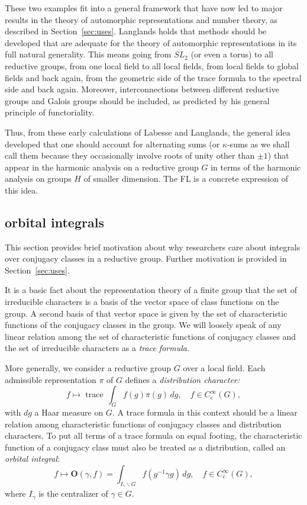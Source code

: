 \documentclass[brochure,english,12pt]{bourbaki}
\theoremstyle{plain}
\def\op#1{{\operatorname{#1}}}
\def\OO{{\mathbf O}}
\begin{document}
These two examples fit into a general framework that have now led to
major results in the theory of automorphic representations and number
theory, as described in Section~\ref{sec:uses}.  Langlands holds that
methods should be developed that are adequate for the theory of
automorphic representations in its full natural generality.  This
means going from $SL_2$ (or even a torus) to all reductive groups,
from one local field to all local fields, from local fields to global
fields and back again, from the geometric side of the trace formula to
the spectral side and back again.  Moreover, interconnections between
different reductive groups and Galois groups should be included, as
predicted by his general principle of functoriality.


Thus, from these early calculations of Labesse and Langlands, the
general idea developed that one should account for alternating sums
(or $\kappa$-sums as we shall call them because they occasionally 
involve roots of unity other than $\pm1$) that appear in the harmonic
analysis on a reductive group $G$ in terms of the harmonic analysis on
groups $H$ of smaller dimension.  The FL is a concrete
expression of this idea.

\subsection{orbital integrals}

This section provides brief motivation about why researchers care about integrals over conjugacy
classes in a reductive group.  Further motivation is provided in Section~\ref{sec:uses}.

It is a basic fact about the representation theory of a finite group that the set of irreducible characters
is a basis of the vector space of class functions on the group.  A second basis of that vector
space is given by the set of characteristic functions of the conjugacy classes in the group.
We will loosely speak of any linear relation among the set of characteristic functions of conjugacy classes
and the set
of irreducible characters as a {\it trace formula}.

More generally, we consider a reductive group $G$ over a local field.
Each admissible representation $\pi$ of $G$ defines a {\it distribution character:}
\[
f\mapsto
\op{trace}\,\int_G f(g)\pi(g)\,dg,\quad  f\in C_c^\infty(G),
\]
with $dg$  a Haar measure on $G$.
A trace formula in this context should be a linear
relation among characteristic functions of conjugacy classes and
distribution characters.  To put all terms of a trace formula on equal
footing, the characteristic function of a conjugacy class must also be
treated as a distribution, called an {\it orbital integral}:
\[
f\mapsto \OO(\gamma,f) = \int_{I_\gamma\backslash G} f(g^{-1}\gamma g)\, dg,\quad f\in C_c^\infty(G),
\]
where $I_\gamma$ is the centralizer of $\gamma\in G$.
\end{document}
